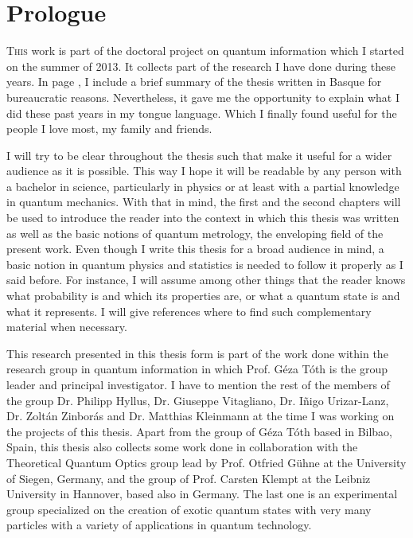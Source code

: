\section*{Prologue}
\setcounter{page}{1}
\fancyfoot[LE,RO]{\thepage}
\label{sec:pr}

\lettrine[lines=2, findent=3pt,nindent=0pt]{T}{his} work is part of the doctoral project on quantum information which I started on the summer of 2013.
It collects part of the research I have done during these years.
In page \pageref{sec:la}, I include a brief summary of the thesis written in Basque for bureaucratic reasons.
Nevertheless, it gave me the opportunity to explain what I did these past years in my tongue language.
Which I finally found useful for the people I love most, my family and friends.

I will try to be clear throughout the thesis such that make it useful for a wider audience as it is possible.
This way I hope it will be readable by any person with a bachelor in science, particularly in physics or at least with a partial knowledge in quantum mechanics.
With that in mind, the first and the second chapters will be used to introduce the reader into the context in which this thesis was written as well as the basic notions of quantum metrology, the enveloping field of the present work.
Even though I write this thesis for a broad audience in mind, a basic notion in quantum physics and statistics is needed to follow it properly as I said before.
For instance, I will assume among other things that the reader knows what probability is and which its properties are, or what a quantum state is and what it represents.
I will give references where to find such complementary material when necessary.

This research presented in this thesis form is part of the work done within the research group in quantum information in which Prof.
G\'eza T\'oth is the group leader and principal investigator.
I have to mention the rest of the members of the group Dr. Philipp Hyllus, Dr. Giuseppe Vitagliano, Dr. I\~nigo Urizar-Lanz, Dr. Zolt\'an Zinbor\'as and Dr. Matthias Kleinmann at the time I was working on the projects of this thesis.
Apart from the group of G\'eza T\'oth based in Bilbao, Spain, this thesis also collects some work done in collaboration with the Theoretical Quantum Optics group lead by Prof. Otfried G\"uhne at the University of Siegen, Germany, and the group of Prof. Carsten Klempt at the Leibniz University in Hannover, based also in Germany.
The last one is an experimental group specialized on the creation of exotic quantum states with very many particles with a variety of applications in quantum technology.

